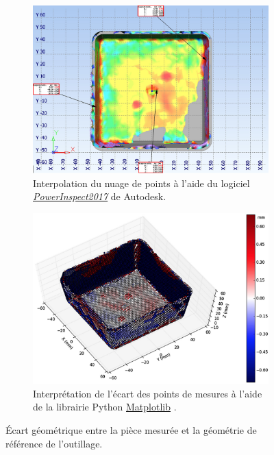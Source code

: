 \begin{figure}[tb]
	\centering
	\begin{subfigure}[c]{0.49\textwidth}
		\includegraphics[width=\textwidth]{../Chap2/Figures/Capture_2019-09-23-13_43_11.jpg}
		\caption{Interpolation du nuage de points à l'aide du logiciel \textit{\href{https://www.autodesk.fr/products/powerinspect/}{PowerInspect2017}} de Autodesk.}
	\end{subfigure}
	\begin{subfigure}[c]{0.49\textwidth}
		\includegraphics[width=\textwidth]{../Chap2/Figures/Capture_2019-09-23_13_42_00.jpg}
		\caption{Interprétation de l'écart des points de mesures à l'aide de la librairie Python \href{https://matplotlib.org/}{Matplotlib} \cite{hunter_matplotlib_2007, caswell_matplotlib_2019}.}
	\end{subfigure}
	\caption{Écart géométrique entre la pièce mesurée et la géométrie de référence de l'outillage.}
	\label{fig:scan_delta}
\end{figure}
